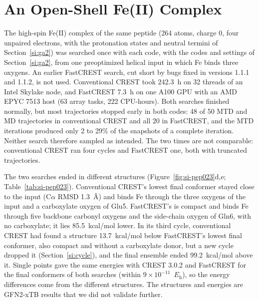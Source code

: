\documentclass[journal=jctcce,manuscript=suppinfo]{achemso}
\newcommand{\Eh}{\ensuremath{E_\mathrm{h}}}
\begin{document}
\section{An Open-Shell Fe(II) Complex}
\label{si:fe}

The high-spin Fe(II) complex of the same peptide (264 atoms, charge 0, four unpaired electrons, with the protonation
states and neutral termini of Section~\ref{si:ga2}) was searched once with each code, with the codes and settings of
Section~\ref{si:ga2}, from one preoptimized helical input in which Fe binds three oxygens. An earlier FastCREST search, cut short by bugs fixed in versions 1.1.1 and 1.1.2, is not used. Conventional CREST took 242.3~h on 32 threads of an
Intel Skylake node, and FastCREST 7.3~h on one A100 GPU with an AMD EPYC 7513 host (63 array tasks, 222 CPU-hours). Both
searches finished normally, but most trajectories stopped early in both codes: 48 of 50 MTD and MD trajectories in
conventional CREST and all 20 in FastCREST, and the MTD iterations produced only 2 to 29\% of the snapshots of a complete
iteration. Neither search therefore sampled as intended. The two times are not comparable: conventional CREST ran four
cycles and FastCREST one, both with truncated trajectories.

The two searches ended in different structures (Figure~\ref{fig:si-pep023}d,e; Table~\ref{tab:si-pep023}). Conventional
CREST's lowest final conformer stayed close to the input (C$\alpha$ RMSD 1.3~\AA) and binds Fe through the three oxygens
of the input and a carboxylate oxygen of Glu5. FastCREST's is compact and binds Fe through five backbone carbonyl oxygens
and the side-chain oxygen of Gln6, with no carboxylate; it lies 85.5~kcal/mol lower. In its third cycle, conventional
CREST had found a structure 13.7~kcal/mol below FastCREST's lowest final conformer, also compact and without a
carboxylate donor, but a new cycle dropped it (Section~\ref{si:cycle}), and the final ensemble ended 99.2~kcal/mol above
it. Single points gave the same energies with CREST 3.0.2 and FastCREST for the final conformers of both searches
(within $9\times10^{-11}$~\Eh), so the energy differences come from the different structures. The
structures and energies are GFN2-xTB results that we did not validate further.
\end{document}
